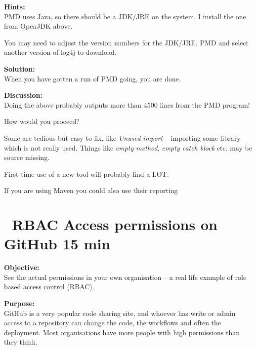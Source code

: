 \documentclass[a4paper,11pt,notitlepage]{report}
\begin{document}
{\bf Hints:}\\
PMD uses Java, so there should be a JDK/JRE on the system, I install the one from OpenJDK above.

You may need to adjust the version numbers for the JDK/JRE, PMD and select another version of log4j to download.

{\bf Solution:}\\
When you have gotten a run of PMD going, you are done.

{\bf Discussion:}\\
Doing the above probably outputs more than 4500 lines from the PMD program!

How would you proceed?

Some are tedious but easy to fix, like \emph{Unused import} -- importing some library which is not really used. Things like \emph{empty method}, \emph{empty catch block} etc. may be source missing.


First time use of a new tool will probably find a LOT.

If you are using Maven you could also use their reporting\\







\chapter{\faExclamationTriangle\ RBAC Access permissions on GitHub 15 min}
\label{ex:github-perms}

{\bf Objective:}\\
See the actual permissions in your own organisation -- a real life example of role based access control (RBAC).

{\bf Purpose:}\\
GitHub is a very popular code sharing site, and whoever has write or admin access to a repository can change the code, the workflows and often the deployment. Most organisations have more people with high permissions than they think.
\end{document}
